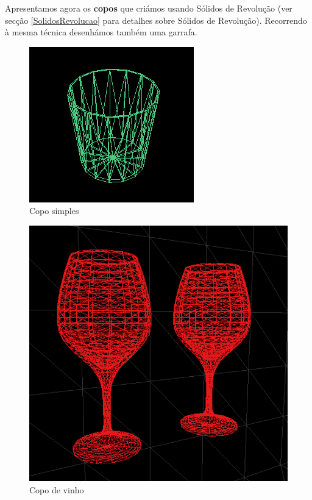 \documentclass[a5paper,onecolumn, 11pt]{article}
\begin{document}
\begin{description}
Apresentamos agora os \textbf{copos} que criámos usando Sólidos de Revolução (ver secção \ref{SolidosRevolucao} para detalhes sobre Sólidos de Revolução). Recorrendo à mesma técnica desenhámos também uma garrafa.
\begin{figure}[!htb]
    \centering
    \includegraphics[scale=0.8]{copo.png}
    \caption{Copo simples}
\end{figure}
\begin{figure}[!htb]
    \centering
    \includegraphics[scale=0.6]{vinho.png}
    \caption{Copo de vinho}
\end{figure}
\begin{figure}[!htb]
    \centering

\end{figure}
\end{description}
\end{document}
